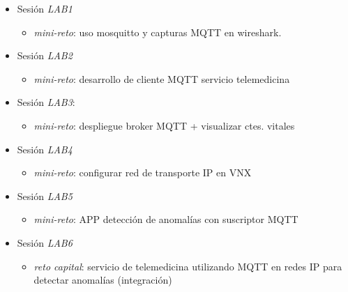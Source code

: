\documentclass[xcolor=table,xcolor=x11names]{beamer}
\begin{document}
\begin{frame}{\subsecname}
    \small
    \begin{itemize}

    \item Sesión \emph{LAB1}
            \begin{itemize}
                \item \emph{mini-reto}: uso mosquitto y capturas MQTT en wireshark.
            \end{itemize}

        \item Sesión \emph{LAB2} 
            \begin{itemize}
                \item\emph{mini-reto}: desarrollo de cliente MQTT servicio telemedicina
            \end{itemize}

\item Sesión \emph{LAB3}:
\begin{itemize}
    \item \emph{mini-reto}: despliegue broker MQTT
        + visualizar ctes. vitales
\end{itemize}


\item Sesión \emph{LAB4}
    \begin{itemize}
        \item \emph{mini-reto}: configurar red de transporte
            IP en VNX
    \end{itemize}


\item Sesión \emph{LAB5}
\begin{itemize}
    \item \emph{mini-reto}: APP detección de
        anomalías con suscriptor MQTT 
\end{itemize}


\item Sesión \emph{LAB6} 
\begin{itemize}
    \item \emph{reto capital}:
servicio de telemedicina
utilizando MQTT en redes IP para detectar anomalías
(integración)
\end{itemize}

\end{itemize}

\end{frame}
\end{document}
